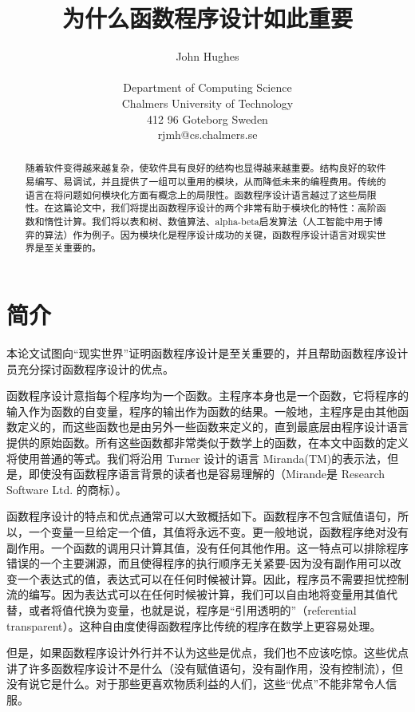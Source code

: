\documentclass[12pt]{article}
\title{为什么函数程序设计如此重要}
\author{John Hughes\\
\\
Department of Computing Science\\
Chalmers University of Technology\\
412 96 Goteborg Sweden\\
rjmh@cs.chalmers.se
}
\date{}
\begin{document}
\maketitle

\begin{abstract}随着软件变得越来越复杂，使软件具有良好的结构也显得越来越重要。结构良好的软件易编写、易调试，并且提供了一组可以重用的模块，从而降低未来的编程费用。传统的语言在将问题如何模块化方面有概念上的局限性。函数程序设计语言越过了这些局限性。在这篇论文中，我们将提出函数程序设计的两个非常有助于模块化的特性：高阶函数和惰性计算。我们将以表和树、数值算法、alpha-beta启发算法（人工智能中用于博弈的算法）作为例子。因为模块化是程序设计成功的关键，函数程序设计语言对现实世界是至关重要的。\end{abstract}

\newpage
\tableofcontents
\newpage

\section{简介}

本论文试图向``现实世界''证明函数程序设计是至关重要的，并且帮助函数程序设计员充分探讨函数程序设计的优点。

函数程序设计意指每个程序均为一个函数。主程序本身也是一个函数，它将程序的输入作为函数的自变量，程序的输出作为函数的结果。一般地，主程序是由其他函数定义的，而这些函数也是由另外一些函数来定义的，直到最底层由程序设计语言提供的原始函数。所有这些函数都非常类似于数学上的函数，在本文中函数的定义将使用普通的等式。我们将沿用 Turner 设计的语言 Miranda(TM)\cite[Tur85]{Tur85}的表示法，但是，即使没有函数程序语言背景的读者也是容易理解的（Mirande是 Research Software Ltd. 的商标）。

函数程序设计的特点和优点通常可以大致概括如下。函数程序不包含赋值语句，所以，一个变量一旦给定一个值，其值将永远不变。更一般地说，函数程序绝对没有副作用。一个函数的调用只计算其值，没有任何其他作用。这一特点可以排除程序错误的一个主要渊源，而且使得程序的执行顺序无关紧要-因为没有副作用可以改变一个表达式的值，表达式可以在任何时候被计算。因此，程序员不需要担忧控制流的编写。因为表达式可以在任何时候被计算，我们可以自由地将变量用其值代替，或者将值代换为变量，也就是说，程序是``引用透明的''（referential transparent）。这种自由度使得函数程序比传统的程序在数学上更容易处理。

但是，如果函数程序设计外行并不认为这些是优点，我们也不应该吃惊。这些优点讲了许多函数程序设计不是什么（没有赋值语句，没有副作用，没有控制流），但没有说它是什么。对于那些更喜欢物质利益的人们，这些``优点''不能非常令人信服。
\end{document}
